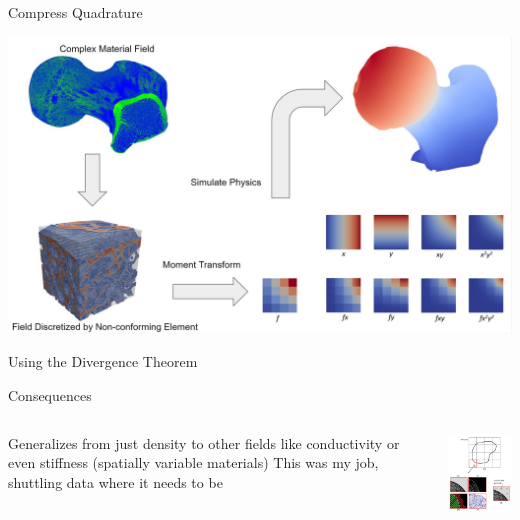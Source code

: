 \begin{frame}{Compress Quadrature}
  \centering
  \begin{center}
    \includegraphics[width=0.8\linewidth]{bone_scan_example.png}\\
  \end{center}
\end{frame}

\begin{frame}{Using the Divergence Theorem}
  \begin{center}

  \end{center}
\end{frame}


\begin{frame}{Consequences}
\begin{columns}
  \begin{outline}
    \1 Generalizes from just density to other fields like conductivity or even stiffness (spatially variable materials)
    \1 This was my job, shuttling data where it needs to be
  \end{outline}
\begin{center}
\includegraphics[width=4cm]{immersed_moments.png} 
\end{center}
\end{columns}
\end{frame}

